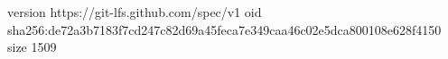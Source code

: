 version https://git-lfs.github.com/spec/v1
oid sha256:de72a3b7183f7cd247c82d69a45feca7e349caa46c02e5dca800108e628f4150
size 1509

